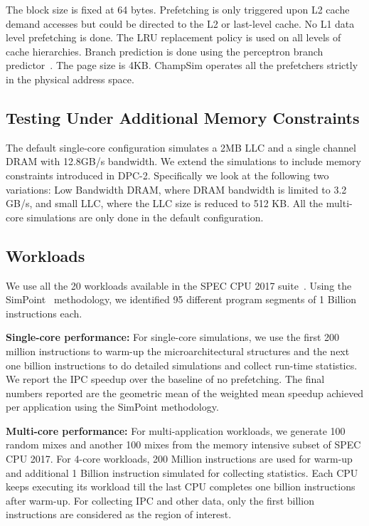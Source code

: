 The block size is fixed at 64 bytes.  Prefetching is only triggered
upon L2 cache demand accesses but could be directed to the L2 or
last-level cache.  No L1 data level prefetching is done. The LRU
replacement policy is used on all levels of cache hierarchies. Branch
prediction is done using the perceptron branch
predictor~\cite{PerceptronPredictor}.  The page size is 4KB.  ChampSim
operates all the prefetchers strictly in the physical address space.

\subsection{Testing Under Additional Memory Constraints}
\label{Method-AdditionalMem}
The default single-core configuration simulates a 2MB LLC and a single
channel DRAM with 12.8GB/s bandwidth. We extend the simulations to
include memory constraints introduced in DPC-2. Specifically we look
at the following two variations: Low Bandwidth DRAM, where DRAM
bandwidth is limited to 3.2 GB/s, and small LLC, where the LLC size is
reduced to 512 KB.  All the multi-core simulations are only done in
the default configuration.

\subsection{Workloads}
\label{Method-Workloads}

We use all the 20 workloads available in the SPEC CPU 2017
suite~\cite{SPEC2017}. Using the SimPoint~\cite{SimPoint} methodology,
we identified 95 different program segments of 1 Billion
instructions each.

\noindent \textbf{Single-core performance:} For single-core
simulations, we use the first 200 million instructions to warm-up the
microarchitectural structures and the next one billion instructions to
do detailed simulations and collect run-time statistics. We report the
IPC speedup over the baseline of no prefetching.  The final numbers
reported are the geometric mean of the weighted mean speedup achieved
per application using the SimPoint methodology.

\noindent \textbf{Multi-core performance:} For multi-application
workloads, we generate 100 random mixes and another 100 mixes from the
memory intensive subset of SPEC CPU 2017.  For 4-core workloads, 200
Million instructions are used for warm-up and additional 1 Billion
instruction simulated for collecting statistics.  Each CPU keeps
executing its workload till the last CPU completes one billion
instructions after warm-up.  For collecting IPC and other data, only
the first billion instructions are considered as the region of
interest.

